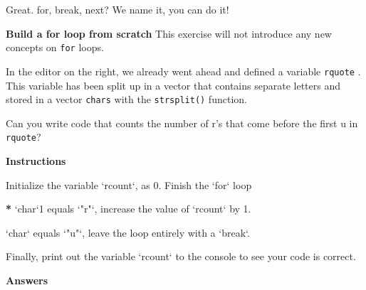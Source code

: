 \documentclass[]{article}
\newcommand{\hlnum}[1]{\textcolor[rgb]{0.816,0.125,0.439}{#1}}%
\newcommand{\hlstr}[1]{\textcolor[rgb]{0.251,0.627,0.251}{#1}}%
\newcommand{\hlstd}[1]{\textcolor[rgb]{0.251,0.251,0.251}{#1}}%
\newcommand{\hlkwc}[1]{\textcolor[rgb]{0.251,0.251,0.251}{#1}}%
\newenvironment{Shaded}{\begin{myshaded}}{\end{myshaded}}
\newcommand{\DataTypeTok}[1]{\hlkwc{#1}}
\newcommand{\DecValTok}[1]{\hlnum{#1}}
\newcommand{\StringTok}[1]{\hlstr{#1}}
\newcommand{\ErrorTok}[1]{\textbf{{#1}}}
\newcommand{\NormalTok}[1]{\hlstd{#1}}
\begin{document}
Great. for, break, next? We name it, you can do it!

\textbf{Build a for loop from scratch} This exercise will not introduce
any new concepts on \texttt{for} loops.

In the editor on the right, we already went ahead and defined a variable
\texttt{rquote} . This variable has been split up in a vector that
contains separate letters and stored in a vector \texttt{chars} with the
\texttt{strsplit()} function.

Can you write code that counts the number of r's that come before the
first u in \texttt{rquote}?

\textbf{Instructions}

\begin{Shaded}
\begin{Highlighting}[]
\NormalTok{Initialize the variable }\StringTok{`}\DataTypeTok{rcount}\StringTok{`}\NormalTok{, as }\DecValTok{0}\NormalTok{.}
\NormalTok{Finish the }\StringTok{`}\DataTypeTok{for}\StringTok{`}\NormalTok{ loop}\OperatorTok{:}

\ErrorTok{*}\StringTok{ } \StringTok{`}\DataTypeTok{char}\StringTok{`}\DecValTok{1}\NormalTok{ equals }\StringTok{`}\DataTypeTok{"r"}\StringTok{`}\NormalTok{, increase the value of }\StringTok{`}\DataTypeTok{rcount}\StringTok{`}\NormalTok{ by }\DecValTok{1}\NormalTok{.}

\OperatorTok{*}\StringTok{ } \StringTok{`}\DataTypeTok{char}\StringTok{`}\NormalTok{ equals }\StringTok{`}\DataTypeTok{"u"}\StringTok{`}\NormalTok{, leave the }\NormalTok{ loop entirely with a }\StringTok{`}\DataTypeTok{break}\StringTok{`}\NormalTok{.}

\NormalTok{Finally, print out the variable }\StringTok{`}\DataTypeTok{rcount}\StringTok{`}\NormalTok{ to the console to see }\NormalTok{ your code is correct.}
\end{Highlighting}
\end{Shaded}

\textbf{Answers}
\end{document}

